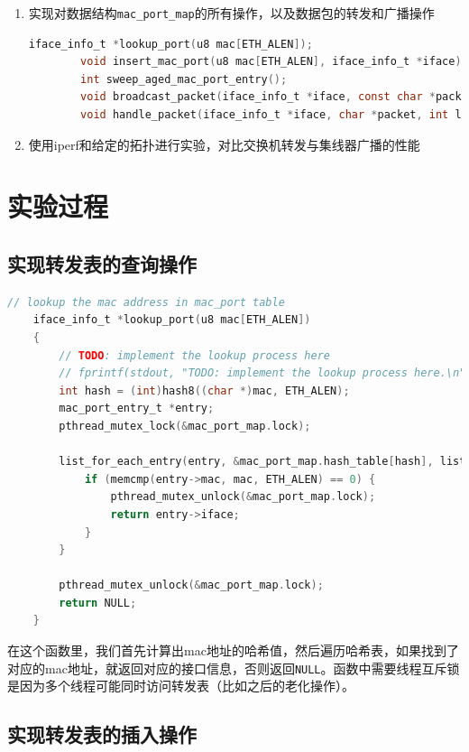 \documentclass[UTF8]{report}
\begin{document}
\begin{enumerate}
    \item 实现对数据结构\texttt{mac_port_map}的所有操作，以及数据包的转发和广播操作
    
    \begin{lstlisting}[language=C]
        iface_info_t *lookup_port(u8 mac[ETH_ALEN]);
        void insert_mac_port(u8 mac[ETH_ALEN], iface_info_t *iface);
        int sweep_aged_mac_port_entry();
        void broadcast_packet(iface_info_t *iface, const char *packet, int len);
        void handle_packet(iface_info_t *iface, char *packet, int len);
    \end{lstlisting}

    \item 使用iperf和给定的拓扑进行实验，对比交换机转发与集线器广播的性能
\end{enumerate}

\section{实验过程}

\subsection{实现转发表的查询操作}

\begin{lstlisting}[language=C]
    // lookup the mac address in mac_port table
    iface_info_t *lookup_port(u8 mac[ETH_ALEN])
    {
        // TODO: implement the lookup process here
        // fprintf(stdout, "TODO: implement the lookup process here.\n");
        int hash = (int)hash8((char *)mac, ETH_ALEN);
        mac_port_entry_t *entry;
        pthread_mutex_lock(&mac_port_map.lock);
    
        list_for_each_entry(entry, &mac_port_map.hash_table[hash], list) {
            if (memcmp(entry->mac, mac, ETH_ALEN) == 0) {
                pthread_mutex_unlock(&mac_port_map.lock);
                return entry->iface;
            }
        }
    
        pthread_mutex_unlock(&mac_port_map.lock);
        return NULL;
    }
\end{lstlisting}

在这个函数里，我们首先计算出mac地址的哈希值，然后遍历哈希表，如果找到了对应的mac地址，就返回对应的接口信息，否则返回\texttt{NULL}。函数中需要线程互斥锁是因为多个线程可能同时访问转发表（比如之后的老化操作）。

\subsection{实现转发表的插入操作}
\end{document}
